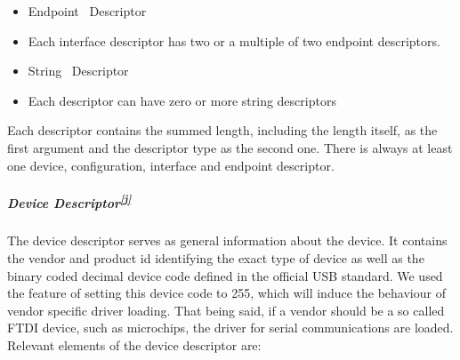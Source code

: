 \begin{itemize}
\tightlist
\item
  {Endpoint ~Descriptor}
\end{itemize}

\begin{itemize}
\tightlist
\item
  {Each interface descriptor has two or a multiple of two endpoint
  descriptors.}
\end{itemize}

\begin{itemize}
\tightlist
\item
  {String ~Descriptor}
\end{itemize}

\begin{itemize}
\tightlist
\item
  {Each descriptor can have zero or more string descriptors}
\end{itemize}

{Each descriptor contains the summed length, including the length
itself, as the first argument and the descriptor type as the second one.
There is always at least one device, configuration, interface and
endpoint descriptor.}

\hypertarget{h.1mpv5d9ppg1r}{\subparagraph{\texorpdfstring{{Device
Descriptor}\textsuperscript{\protect\hyperlink{cmnt10}{{[}j{]}}}}{Device Descriptor{[}j{]}}}\label{h.1mpv5d9ppg1r}}

{The device descriptor serves as general information about the device.
It contains the vendor and product id identifying the exact type of
device as well as the binary coded decimal device code defined in the
official USB standard. We used the feature of setting this device code
to 255, which will induce the behaviour of vendor specific driver
loading. That being said, if a vendor should be a so called FTDI device,
such as microchips, the driver for serial communications are loaded.
Relevant elements of the device descriptor are: }

\href{}{}\href{}{}


